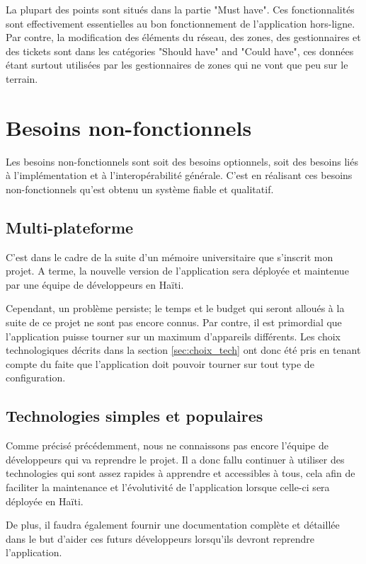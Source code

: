 \documentclass{EPL-master-thesis-covers-FR}
\begin{document}
				La plupart des points sont situés dans la partie "Must have". Ces fonctionnalités sont effectivement essentielles au bon fonctionnement de l'application hors-ligne. Par contre, la modification des éléments du réseau, des zones, des gestionnaires et des tickets sont dans les catégories "Should have" and "Could have", ces données étant surtout utilisées par les gestionnaires de zones qui ne vont que peu sur le terrain.			

		\section{Besoins non-fonctionnels}
			Les besoins non-fonctionnels sont soit des besoins optionnels, soit des besoins liés à l'implémentation et à l'interopérabilité générale. C'est en réalisant ces besoins non-fonctionnels qu'est obtenu un système fiable et qualitatif.
					
			\subsection*{Multi-plateforme}
			\label{sec:multi}
				C'est dans le cadre de la suite d'un mémoire universitaire que s'inscrit mon projet. A terme, la nouvelle version de l'application sera déployée et maintenue par une équipe de développeurs en Haïti.
				
				Cependant, un problème persiste; le temps et le budget qui seront alloués à la suite de ce projet ne sont pas encore connus. Par contre, il est primordial que l'application puisse tourner sur un maximum d'appareils différents. Les choix technologiques décrits dans la section \ref{sec:choix_tech} ont donc été pris en tenant compte du faite que l'application doit pouvoir tourner sur tout type de configuration.
				
			\subsection*{Technologies simples et populaires}
				Comme précisé précédemment, nous ne connaissons pas encore l'équipe de développeurs qui va reprendre le projet. Il a donc fallu continuer à utiliser des technologies qui sont assez rapides à apprendre et accessibles à tous, cela afin de faciliter la maintenance et l'évolutivité de l'application lorsque celle-ci sera déployée en Haïti.	
				
				De plus, il faudra également fournir une documentation complète et détaillée dans le but d'aider ces futurs développeurs lorsqu'ils devront reprendre l'application.
				
\end{document}

